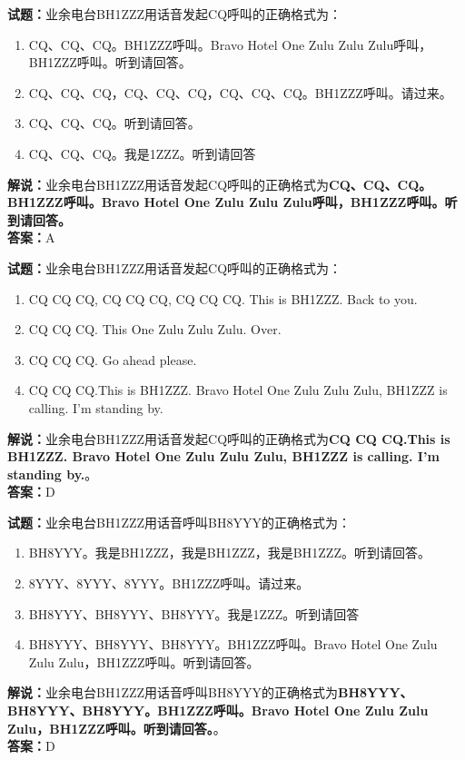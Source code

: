 \documentclass{ctexbook}
\begin{document}
\bigskip


\noindent\textbf{试题：}业余电台BH1ZZZ用话音发起CQ呼叫的正确格式为：
\begin{enumerate}[leftmargin=3em]
\item CQ、CQ、CQ。BH1ZZZ呼叫。Bravo Hotel One Zulu Zulu Zulu呼叫，BH1ZZZ呼叫。听到请回答。
\item CQ、CQ、CQ，CQ、CQ、CQ，CQ、CQ、CQ。BH1ZZZ呼叫。请过来。
\item CQ、CQ、CQ。听到请回答。
\item CQ、CQ、CQ。我是1ZZZ。听到请回答
\end{enumerate}
\noindent\textbf{解说：}业余电台BH1ZZZ用话音发起CQ呼叫的正确格式为\textbf{CQ、CQ、CQ。BH1ZZZ呼叫。Bravo Hotel One Zulu Zulu Zulu呼叫，BH1ZZZ呼叫。听到请回答。}\\\noindent\textbf{答案：}A



\bigskip


\noindent\textbf{试题：}业余电台BH1ZZZ用话音发起CQ呼叫的正确格式为：
\begin{enumerate}[leftmargin=3em]
\item CQ CQ CQ, CQ CQ CQ, CQ CQ CQ. This is BH1ZZZ. Back to you.
\item CQ CQ CQ. This One Zulu Zulu Zulu. Over.
\item CQ CQ CQ. Go ahead please.
\item CQ CQ CQ.This is BH1ZZZ. Bravo Hotel One Zulu Zulu Zulu, BH1ZZZ is calling. I’m standing by.
\end{enumerate}
\noindent\textbf{解说：}业余电台BH1ZZZ用话音发起CQ呼叫的正确格式为\textbf{CQ CQ CQ.This is BH1ZZZ. Bravo Hotel One Zulu Zulu Zulu, BH1ZZZ is calling. I’m standing by.}。\\\noindent\textbf{答案：}D



\bigskip


\noindent\textbf{试题：}业余电台BH1ZZZ用话音呼叫BH8YYY的正确格式为：
\begin{enumerate}[leftmargin=3em]
\item BH8YYY。我是BH1ZZZ，我是BH1ZZZ，我是BH1ZZZ。听到请回答。
\item 8YYY、8YYY、8YYY。BH1ZZZ呼叫。请过来。
\item BH8YYY、BH8YYY、BH8YYY。我是1ZZZ。听到请回答
\item BH8YYY、BH8YYY、BH8YYY。BH1ZZZ呼叫。Bravo Hotel One Zulu Zulu Zulu，BH1ZZZ呼叫。听到请回答。
\end{enumerate}
\noindent\textbf{解说：}业余电台BH1ZZZ用话音呼叫BH8YYY的正确格式为\textbf{BH8YYY、BH8YYY、BH8YYY。BH1ZZZ呼叫。Bravo Hotel One Zulu Zulu Zulu，BH1ZZZ呼叫。听到请回答。}。\\\noindent\textbf{答案：}D
\end{document}
